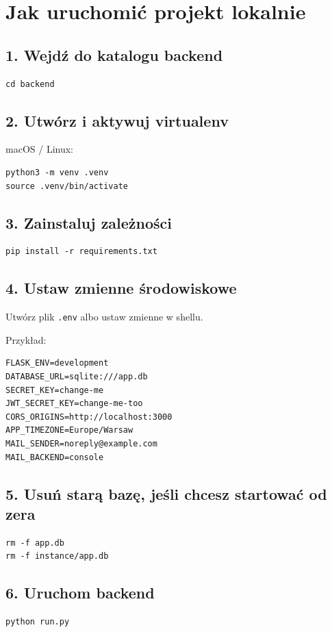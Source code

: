 \documentclass[11pt,a4paper]{article}
\begin{document}
\section{Jak uruchomić projekt lokalnie}

\subsection{1. Wejdź do katalogu backend}
\begin{lstlisting}
cd backend
\end{lstlisting}

\subsection{2. Utwórz i aktywuj virtualenv}
macOS / Linux:
\begin{lstlisting}
python3 -m venv .venv
source .venv/bin/activate
\end{lstlisting}

\subsection{3. Zainstaluj zależności}
\begin{lstlisting}
pip install -r requirements.txt
\end{lstlisting}

\subsection{4. Ustaw zmienne środowiskowe}

Utwórz plik \texttt{.env} albo ustaw zmienne w shellu.

Przykład:
\begin{lstlisting}
FLASK_ENV=development
DATABASE_URL=sqlite:///app.db
SECRET_KEY=change-me
JWT_SECRET_KEY=change-me-too
CORS_ORIGINS=http://localhost:3000
APP_TIMEZONE=Europe/Warsaw
MAIL_SENDER=noreply@example.com
MAIL_BACKEND=console
\end{lstlisting}

\subsection{5. Usuń starą bazę, jeśli chcesz startować od zera}
\begin{lstlisting}
rm -f app.db
rm -f instance/app.db
\end{lstlisting}

\subsection{6. Uruchom backend}
\begin{lstlisting}
python run.py
\end{lstlisting}
\end{document}
